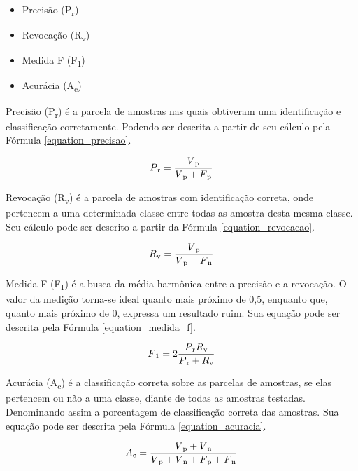 \documentclass[
	12pt,				%
	oneside,			%
	a4paper,			%
	english,			%
	brazil				%
	]{abntex2ppgsi}
\begin{document}
\begin{itemize}
  \item Precisão (P\textsubscript{r})
  \item Revocação (R\textsubscript{v})
  \item Medida F (F\textsubscript{1})
  \item Acurácia (A\textsubscript{c})
\end{itemize}

Precisão (P\textsubscript{r}) é a parcela de amostras nas quais obtiveram uma identificação e classificação corretamente. Podendo ser descrita a partir de seu cálculo pela Fórmula \ref{equation_precisao}.

\begin{equation}
  P\textsubscript{r}=\frac{V\textsubscript{p}}{V\textsubscript{p}+F\textsubscript{p}}
  \label{equation_precisao}
\end{equation}

Revocação (R\textsubscript{v}) é a parcela de amostras com identificação correta, onde pertencem a uma determinada classe entre todas as amostra desta mesma classe. Seu cálculo pode ser descrito a partir da Fórmula \ref{equation_revocacao}.

\begin{equation}
  R\textsubscript{v}=\frac{V\textsubscript{p}}{V\textsubscript{p}+F\textsubscript{n}}
  \label{equation_revocacao}
\end{equation}

Medida F (F\textsubscript{1}) é a busca da média harmônica entre a precisão e a revocação. O valor da medição torna-se ideal quanto mais próximo de 0,5, enquanto que, quanto mais próximo de 0, expressa um resultado ruim. Sua equação pode ser descrita pela Fórmula \ref{equation_medida_f}.

\begin{equation}
  F\textsubscript{1}=2\frac{P\textsubscript{r}R\textsubscript{v}}{P\textsubscript{r}+R\textsubscript{v}}
  \label{equation_medida_f}
\end{equation}

Acurácia (A\textsubscript{c}) é a classificação correta sobre as parcelas de amostras, se elas pertencem ou não a uma classe, diante de todas as amostras testadas. Denominando assim a porcentagem de classificação correta das amostras. Sua equação pode ser descrita pela Fórmula \ref{equation_acuracia}.

\begin{equation}
  A\textsubscript{c}=\frac{V\textsubscript{p}+V\textsubscript{n}}{V\textsubscript{p}+V\textsubscript{n}+F\textsubscript{p}+F\textsubscript{n}}
  \label{equation_acuracia}
\end{equation}
\end{document}
